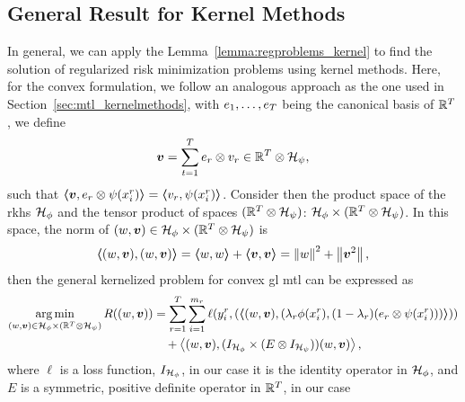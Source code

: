 \subsection{General Result for Kernel Methods}
In general, we can apply the Lemma~\ref{lemma:regproblems_kernel} to find the solution of regularized risk minimization problems using kernel methods.
Here, for the convex formulation, we follow an analogous approach as the one used in Section~\ref{sec:mtl_kernelmethods}, with ${e_1, \ldots, e_T}$ being the canonical basis of $\mathbb{R}^T$, we define
\begin{equation}
    \label{eq:vtensor_def}
    \fv{v} = \sum_{t=1}^T e_r \otimes v_r \in \reals^\ntasks \otimes \hilbertspace_\psi,
\end{equation}
such that
$\bm{\left\langle} \bm{v}, e_r \otimes \psi(x_i^r) \bm{\right\rangle} = \bm{\left\langle} v_r, \psi(x_i^r) \bm{\right\rangle}$.
Consider then the product space of the \acrshort{rkhs} $\mathcal{H}_\phi$ and the tensor product of spaces $(\mathbb{R}^T \otimes \mathcal{H}_\psi)$: $\mathcal{H}_\phi \times (\mathbb{R}^T \otimes \mathcal{H}_\psi)$. In this space, the norm of $(w, \bm{v}) \in \mathcal{H}_\phi \times (\mathbb{R}^T \otimes \mathcal{H}_\psi)$ is
$$\bm{\left\langle} (w, \bm{v}), (w, \bm{v}) \bm{\right\rangle} =  \bm{\left\langle} w, w \bm{\right\rangle} + \bm{\left\langle} \bm{v}, \bm{v} \bm{\right\rangle} = \left\lVert w\right\rVert^2 + \left\lVert\bm{v}^2\right\rVert,$$
then the general kernelized problem for convex \acrshort{gl} \acrshort{mtl} can be expressed as
\begin{equation}\label{eq:cvxgl_general_problem_tensor}
    \begin{aligned}
        \argmin_{(w, \fv{v}) \in \hilbertspace_\phi \times (\reals^\ntasks \otimes \hilbertspace_\psi)} R((w, \fv{v})) & = \sum_{r=1}^\ntasks \sum_{i=1}^{\npertask_r} \ell(y_i^r, (\dotp{(w, \fv{v})}{(\lambda_r \phi(x_i^r), (1 - \lambda_r) (e_r \otimes \psi({x}_i^r)))})) \\
                                                                                                                       & \quad + \dotp{(w, \fv{v})}{(I_{\rkhs_\phi} \times (E \otimes I_{\rkhs_\psi})) (w, \fv{v})}  ,
    \end{aligned}
\end{equation}
where $\ell$ is a loss function, $I_{\mathcal{H}_\phi}$, in our case it is the identity operator in $\mathcal{H}_\phi$, and $E$ is a symmetric, positive definite operator in $\mathbb{R}^T$, in our case
